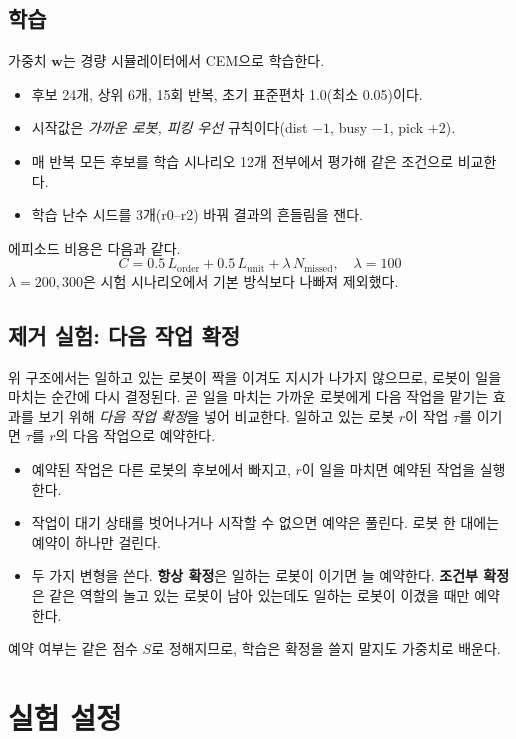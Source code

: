 \documentclass[10pt,twocolumn]{article}
\begin{document}
\subsection{학습}
가중치 $\mathbf{w}$는 경량 시뮬레이터에서 CEM으로 학습한다.
\begin{itemize}
  \item 후보 24개, 상위 6개, 15회 반복, 초기 표준편차 1.0(최소 0.05)이다.
  \item 시작값은 \emph{가까운 로봇, 피킹 우선} 규칙이다(dist $-1$, busy $-1$, pick $+2$).
  \item 매 반복 모든 후보를 학습 시나리오 12개 전부에서 평가해 같은 조건으로 비교한다.
  \item 학습 난수 시드를 3개(r0--r2) 바꿔 결과의 흔들림을 잰다.
\end{itemize}
에피소드 비용은 다음과 같다.
\begin{equation}
  C = 0.5\,L_{\text{order}} + 0.5\,L_{\text{unit}} + \lambda\,N_{\text{missed}}, \quad \lambda = 100
\end{equation}
$\lambda=200, 300$은 시험 시나리오에서 기본 방식보다 나빠져 제외했다.

\subsection{제거 실험: 다음 작업 확정}
위 구조에서는 일하고 있는 로봇이 짝을 이겨도 지시가 나가지 않으므로, 로봇이 일을 마치는 순간에 다시 결정된다.
곧 일을 마치는 가까운 로봇에게 다음 작업을 맡기는 효과를 보기 위해 \emph{다음 작업 확정}을 넣어 비교한다.
일하고 있는 로봇 $r$이 작업 $\tau$를 이기면 $\tau$를 $r$의 다음 작업으로 예약한다.
\begin{itemize}
  \item 예약된 작업은 다른 로봇의 후보에서 빠지고, $r$이 일을 마치면 예약된 작업을 실행한다.
  \item 작업이 대기 상태를 벗어나거나 시작할 수 없으면 예약은 풀린다. 로봇 한 대에는 예약이 하나만 걸린다.
  \item 두 가지 변형을 쓴다. \textbf{항상 확정}은 일하는 로봇이 이기면 늘 예약한다. \textbf{조건부 확정}은 같은 역할의 놀고 있는 로봇이 남아 있는데도 일하는 로봇이 이겼을 때만 예약한다.
\end{itemize}
예약 여부는 같은 점수 $S$로 정해지므로, 학습은 확정을 쓸지 말지도 가중치로 배운다.

\section{실험 설정}
\end{document}
